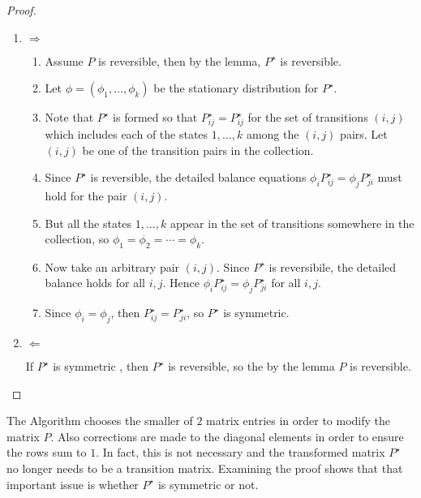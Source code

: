 \documentclass[12pt]{article}
\begin{document}
\begin{proof}
  \begin{enumerate}
  \item $\Rightarrow$
    \begin{enumerate}
    \item Assume $P$ is reversible, then by the lemma, $P^{\star}$ is
      reversible.
    \item Let $\phi = (\phi_1, \dots, \phi_k)$ be the stationary
      distribution for $P^{\star}$.
    \item Note that $P^{\star}$ is formed so that $P_{ij}^{\star} =
      P_{ij}^{\star}$ for the set of transitions $(i,j)$ which
      includes each of the states $1, \dots, k$ among the $(i,j)$
      pairs.  Let $(i,j)$ be one of the transition pairs in the
      collection.
    \item Since $P^{\star}$ is reversible, the detailed balance
      equations  $\phi_i P_{ij}^{\star} = \phi_j
      P_{ji}^{\star}$ must hold for the pair $(i,j)$.
    \item But all the states $1, \dots, k$ appear in the set of
      transitions somewhere in the collection, so $\phi_1 = \phi_2 =
      \cdots = \phi_k$.
    \item Now take an arbitrary pair $(i,j)$.  Since $P^{\star}$ is
      reversibile, the detailed balance holds for all $i,j$.  Hence
      $\phi_i P_{ij}^{\star} = \phi_j P_{ji}^{\star}$ for all $i,j$.
    \item Since $\phi_i = \phi_j$, then $P_{ij}^{\star} =
      P_{ji}^{\star}$, so $P^{\star}$ is symmetric.
    \end{enumerate}
  \item $\Leftarrow$

    If $P^{\star}$ is symmetric , then $P^{\star}$ is reversible, so
    the by the lemma $P$ is reversible.
  \end{enumerate}
\end{proof}

\begin{remark}
  The Algorithm chooses the smaller of $2$ matrix entries in order to
  modify the matrix $P$.  Also corrections are made to the diagonal
  elements in order to ensure the rows sum to $1$.  In fact, this is
  not necessary and the transformed matrix $P^{\star}$ no longer needs
  to be a transition matrix.  Examining the proof shows that that
  important issue is whether $P^{\star}$ is symmetric or not.
\end{remark}
\end{document}
